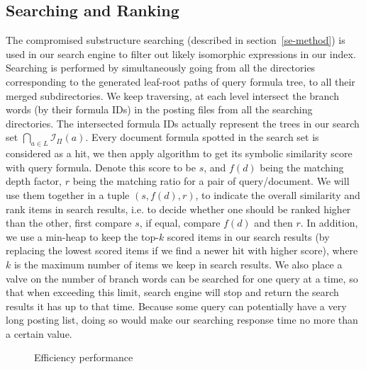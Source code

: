 \documentclass{acm_proc_article-sp}
\begin{document}
\subsection{Searching and Ranking}
\label{se-and-rank}
The compromised substructure searching (described in section~\ref{se-method}) is used in our search engine to filter out likely isomorphic expressions in our index.
Searching is performed by simultaneously going from all the directories corresponding to the generated leaf-root paths of query formula tree,
to all their merged subdirectories. 
We keep traversing, at each level intersect the branch words (by their formula IDs) in the posting files from all the searching directories. 
The intersected formula IDs actually represent the trees in our search set $\bigcap_{a \in L} \mathcal{I}_{\Pi}(a)$.
Every document formula spotted in the search set is considered as a hit, we then apply  algorithm to get its symbolic similarity score with query formula. 
Denote this score to be $s$, and $f(d)$ being the matching depth factor, $r$ being the matching ratio for a pair of query/document. 
We will use them together in a tuple $(s, f(d), r)$, to indicate the overall similarity and rank items in search results,
i.e. to decide whether one should be ranked higher than the other, first compare $s$, if equal, compare $f(d)$ and then $r$.
In addition, we use a min-heap to keep the top-$k$ scored items in our search results (by replacing the lowest scored items if we find a newer hit with higher score), where $k$ is the maximum number of items we keep in search results.
We also place a valve on the number of branch words can be searched for one query at a time,
so that when exceeding this limit, search engine will stop and return the search results it has up to that time. Because some query can potentially have a very long posting list, doing so would make our searching response time no more than a certain value.

\begin{figure}
\begin{center}
\end{center}
\caption{Efficiency performance}\label{effiperf}
\end{figure}
\end{document}
